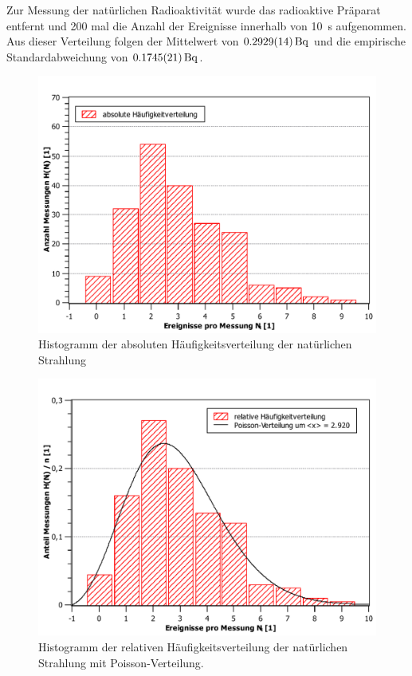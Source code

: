 	Zur Messung der natürlichen Radioaktivität wurde das radioaktive Präparat entfernt und 200 mal die Anzahl der Ereignisse innerhalb von \SI{10}{\second} aufgenommen.
	Aus dieser Verteilung folgen der Mittelwert von $\SI{0.2929+-0.0014}{\becquerel}$ und die empirische Standardabweichung von $\SI{0.1745+-0.0021}{\becquerel}$. 
	\begin{figure}[ht]
		\centering
		\includegraphics[width=\textwidth]{data/bckgndHistogrammAbs.pdf}
		\caption{Histogramm der absoluten Häufigkeitsverteilung der natürlichen Strahlung}
		\label{fig:absolut}	
	\end{figure}
	\begin{figure}[ht]
		\centering
		\includegraphics[width=\textwidth]{data/bckgndHistogrammRelPoisson.pdf}
		\caption{Histogramm der relativen Häufigkeitsverteilung der natürlichen Strahlung mit Poisson-Verteilung.}
		\label{fig:relativ}	
	\end{figure}
